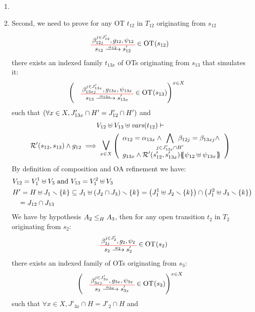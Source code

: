 \documentclass[runningheads]{llncs}
\begin{document}
\begin{enumerate}
\item {}

\item Second, we need to prove for any OT $t_{12}$ in $T_{12}$ originating from $s_{12}$

\begin{align*}
		&  \OTx{12}{}{12}{12} \in \fOT{s_{12}}
\end{align*}		
there exists an indexed family $t_{13x}$ of OTs originating from $s_{13}$ that simulates it: 
\begin{align*}
		&  \mpar{\OTx{13}{x}{13x}{13x} \in \fOT{s_{13}}}^{x \in X}
\end{align*}	
such that  $\mpar{\forall x \in X, J'_{13x} \cap H' = J'_{12} \cap H'}$ and
\begin{multline*}	
V_{12} \uplus V_{13} \uplus \fvars{t_{12}} \vdash\\ \mathcal{R}'\mpar{s_{12}, s_{13}} \wedge g_{12} \implies \operatorname*{\bigsymb{\bigvee}}_{x \in X} \mpar{\everymath{\displaystyle}\begin{array}{l}
			\alpha_{12} = \alpha_{13x} \wedge \bigwedge_\subbox{j \in J'_{13x} \cap H'} \beta_{12j} = \beta_{13xj} \wedge\\[12pt]
			 g_{13x} \wedge \mathcal{R}'\mpar{s'_{12}, s'_{13x}}\psubst{\psi_{12} \uplus \psi_{13x}}
		\end{array}} 
	\end{multline*}
By definition of composition and OA refinement we have: 
\begin{align*}
&V_{12}= V^1_1\uplus V_3 \text{ and }
V_{13}= V^2_1\uplus V_3\\
& H'=H\uplus J_1 \setminus \{k\} \subseteq J_1\uplus \mpar{J_2 \cap J_3} \setminus \{k\}= \mpar{J^1_1\uplus J_2 \setminus \{k\} } \cap \mpar{J^2_1\uplus J_3 \setminus \{k\}} \\ &\,\,\,\,\, = J_{12 } \cap J_{13} 
\end{align*}
We have by hypothesis $\wrel{A_2}{A_3}{H}$, then for any open transition $t_2$ in $T_2$  originating from $s_2$:
\begin{align*}
\OTx{2}{}{2}{2} \in \fOT{s_2}
\end{align*}
there exists an indexed family of OTs originating from $s_{3}$: 
\begin{align*}
\mpar{\OTx{3}{x}{3x}{3x} \in \fOT{s_{3}}}^{x \in X} 
\end{align*}
such that $\forall x \in X, J'_{3x} \cap H = J'_2 \cap H$ and

\end{enumerate}
\end{document}
